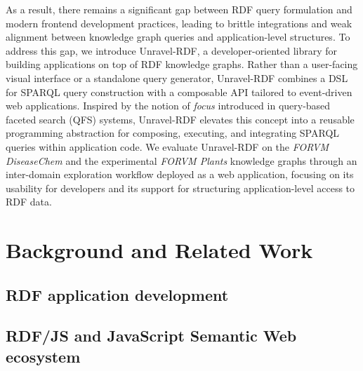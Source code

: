 \documentclass[
]{ceurart}
\begin{document}
As a result, there remains a significant gap between RDF query
formulation and modern frontend development practices, leading to
brittle integrations and weak alignment between knowledge graph queries
and application-level structures. To address this gap, we introduce
Unravel-RDF, a developer-oriented library for building applications on
top of RDF knowledge graphs. Rather than a user-facing visual interface
or a standalone query generator, Unravel-RDF combines a DSL for SPARQL
query construction with a composable API tailored to event-driven web
applications. Inspired by the notion of \emph{focus} introduced in
query-based faceted search (QFS) systems, Unravel-RDF elevates this
concept into a reusable programming abstraction for composing,
executing, and integrating SPARQL queries within application code. We
evaluate Unravel-RDF on the \textit{FORVM DiseaseChem}
\citep{delmas_forum_2021} and the experimental \textit{FORVM Plants}
knowledge graphs through an inter-domain exploration workflow deployed
as a web application, focusing on its usability for developers and its
support for structuring application-level access to RDF data.

\section{Background and Related Work}

\subsection{RDF application development}




\subsection{RDF/JS and JavaScript Semantic Web ecosystem}



\end{document}
